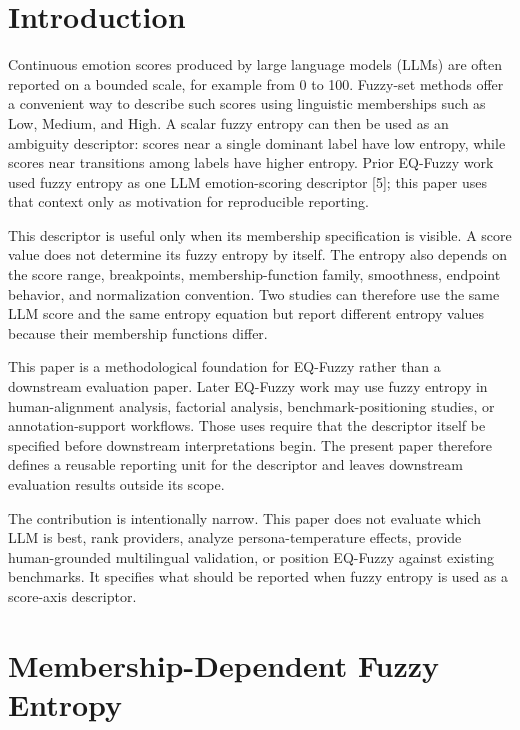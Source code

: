 \documentclass[a4paper,10pt,twocolumn]{myjarticle2}
\begin{document}
\section{Introduction}

Continuous emotion scores produced by large language models (LLMs) are often
reported on a bounded scale, for example from 0 to 100. Fuzzy-set methods offer
a convenient way to describe such scores using linguistic memberships such as
Low, Medium, and High. A scalar fuzzy entropy can then be used as an ambiguity
descriptor: scores near a single dominant label have low entropy, while scores
near transitions among labels have higher entropy. Prior EQ-Fuzzy work used
fuzzy entropy as one LLM emotion-scoring descriptor [5]; this paper uses that
context only as motivation for reproducible reporting.

This descriptor is useful only when its membership specification is visible.
A score value does not determine its fuzzy entropy by itself. The entropy also
depends on the score range, breakpoints, membership-function family,
smoothness, endpoint behavior, and normalization convention. Two studies can
therefore use the same LLM score and the same entropy equation but report
different entropy values because their membership functions differ.

This paper is a methodological foundation for EQ-Fuzzy rather than a downstream
evaluation paper. Later EQ-Fuzzy work may use fuzzy entropy in human-alignment
analysis, factorial analysis, benchmark-positioning studies, or
annotation-support workflows. Those uses require that the descriptor itself be
specified before downstream interpretations begin. The present paper therefore
defines a reusable reporting unit for the descriptor and leaves downstream
evaluation results outside its scope.

The contribution is intentionally narrow. This paper does not evaluate which
LLM is best, rank providers, analyze persona-temperature effects, provide
human-grounded multilingual validation, or position EQ-Fuzzy against existing
benchmarks. It specifies what should be reported when fuzzy entropy is used as
a score-axis descriptor.

\section{Membership-Dependent Fuzzy Entropy}
\end{document}
